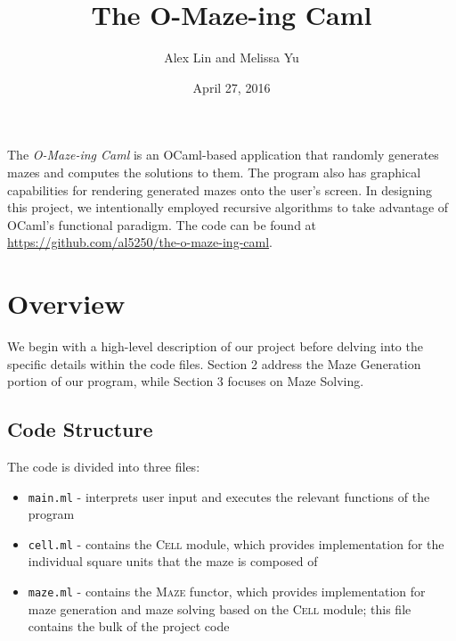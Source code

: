 \documentclass[11pt, margin=1in]{article}
\begin{document}
\title{The O-Maze-ing Caml}
\author{Alex Lin and Melissa Yu}
\date{April 27, 2016}
\maketitle

\setlength\parindent{0pt}

The \textit{O-Maze-ing Caml} is an OCaml-based application that randomly generates mazes and computes the solutions to them.  The program also has graphical capabilities for rendering generated mazes onto the user's screen.  In designing this project, we intentionally employed recursive algorithms to take advantage of OCaml's functional paradigm.  The code can be found at \url{https://github.com/al5250/the-o-maze-ing-caml}.  

\tableofcontents

\newpage
\section{Overview}

We begin with a high-level description of our project before delving into the specific details within the code files.  Section 2 address the Maze Generation portion of our program, while Section 3 focuses on Maze Solving.  

\subsection{Code Structure}  %
The code is divided into three files:
\begin{itemize}
\item \texttt{main.ml} - interprets user input and executes the relevant functions of the program  
\item \texttt{cell.ml} - contains the \textsc{Cell} module, which provides implementation for the individual square units that the maze is composed of
\item \texttt{maze.ml} - contains the \textsc{Maze} functor, which provides implementation for maze generation and maze solving based on the \textsc{Cell} module; this file contains the bulk of the project code   
\end{itemize} 
\end{document}
